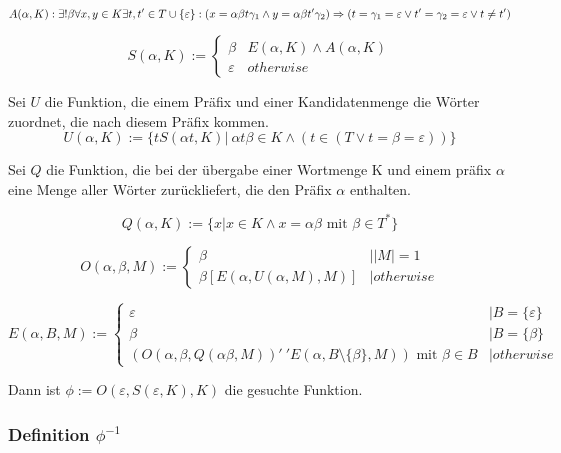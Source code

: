 \documentclass[]{article}
\begin{document}
\[ 
  A(\alpha, K): 
    \exists ! \beta \forall x, y\in K\exists t, t' \in T\cup\{\varepsilon\}: \\
    ( x = \alpha \beta t \gamma_1 \land y = \alpha \beta t' \gamma_2 ) \Rightarrow 
    ( t = \gamma_1 = \varepsilon \lor t' = \gamma_2 = \varepsilon \lor t \neq t' )
\] 

\[
  S( \alpha, K ) := 
  \begin{cases}
    \beta & E(\alpha,K) \land A(\alpha,K) \\
    \varepsilon & otherwise
  \end{cases}
\] 
    
%   

Sei $U$ die Funktion, die einem Präfix und einer Kandidatenmenge die Wörter zuordnet, die nach diesem Präfix kommen.
\[ U( \alpha, K ) := \{t S(\alpha t, K) |\ \alpha t \beta \in K \land ( t\in (T \lor t=\beta=\varepsilon )) \} \] 

Sei $Q$ die Funktion, die bei der übergabe einer Wortmenge K und einem präfix $\alpha$ eine Menge aller Wörter zurückliefert, die den Präfix $\alpha$ enthalten.

\[ Q(\alpha, K):= \{x |x\in K\land x=\alpha\beta\text{ mit } \beta \in T^*\} \] 

\[ 
  O(\alpha, \beta, M):=
  \begin{cases}
    \beta & | |M| = 1 \\
    \beta [E(\alpha, U( \alpha, M ), M)] &|otherwise
  \end{cases}
\] 

\[ 
  E( \alpha, B, M ) := 
  \begin{cases}
    \varepsilon & |B =  \{ \varepsilon \}\\
    \beta & |B =  \{ \beta \}\\
    (O(\alpha, \beta, Q(\alpha\beta, M))'\ ' E(\alpha, B\setminus \{\beta\}, M))\text{ mit }\beta\in B &| otherwise
  \end{cases}
\] 

Dann ist $\phi := O( \varepsilon, S(\varepsilon, K), K)$ die gesuchte Funktion.


\subsubsection*{Definition $\phi^{-1}$}
\end{document}
